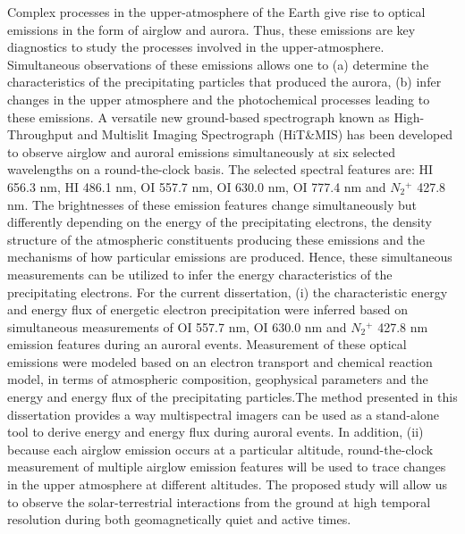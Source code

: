 % 
% 
%

Complex processes in the upper-atmosphere of the Earth give rise to optical emissions in the form of airglow and aurora. Thus, these emissions are key diagnostics to study the processes involved in the upper-atmosphere. Simultaneous observations of these emissions allows one to (a) determine the characteristics of the precipitating particles that produced the aurora, (b) infer changes in the upper atmosphere and the photochemical processes leading to these emissions. A versatile new ground-based spectrograph known as High-Throughput and Multislit Imaging Spectrograph (HiT\&MIS) has been developed to observe airglow and auroral emissions simultaneously at six selected wavelengths on a round-the-clock basis. The selected spectral features are: HI 656.3 nm, HI 486.1 nm, OI 557.7 nm, OI 630.0 nm, OI 777.4 nm and $N_2$$^+$ 427.8 nm. The brightnesses of these emission features change simultaneously but differently depending on the energy of the precipitating electrons, the density structure of the atmospheric constituents producing these emissions and the mechanisms of how particular emissions are produced. Hence, these simultaneous measurements can be utilized to infer the energy characteristics of the precipitating electrons. For the current dissertation, (i) the characteristic energy and energy flux of energetic electron precipitation were inferred based on simultaneous measurements of OI 557.7 nm, OI 630.0 nm and $N_2$$^+$ 427.8 nm emission features during an auroral events. Measurement of these optical emissions were modeled based on an electron transport and chemical reaction model, in terms of atmospheric composition, geophysical parameters and the energy and energy flux of the precipitating particles.The method presented in this dissertation provides a way multispectral imagers can be used as a stand-alone tool to derive energy and energy flux during auroral events. In addition, (ii) because each airglow emission occurs at a particular altitude, round-the-clock measurement of multiple airglow emission features will be used to trace changes in the upper atmosphere at different altitudes. The proposed study will allow us to observe the solar-terrestrial interactions from the ground at high temporal resolution during both geomagnetically quiet and active times.